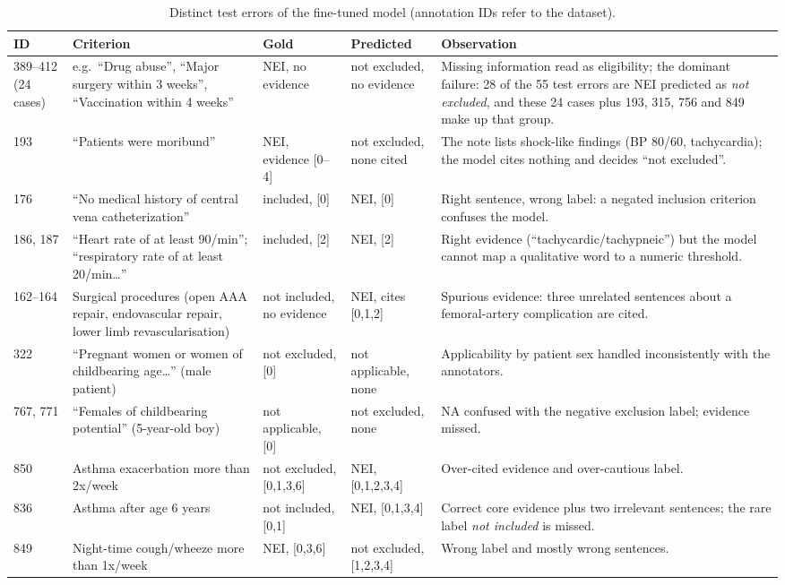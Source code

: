 \documentclass[conference]{IEEEtran}
\begin{document}
\begin{table}[t]
\centering\footnotesize
\caption{Distinct test errors of the fine-tuned model (annotation IDs refer to the dataset).}
\label{tab:errors}
\begin{tabular}{@{}p{0.9cm}p{4.6cm}p{2.3cm}p{2.3cm}p{5.8cm}@{}}\toprule
ID & Criterion & Gold & Predicted & Observation\\\midrule
389--412 (24 cases) & e.g.\ ``Drug abuse'', ``Major surgery within 3 weeks'', ``Vaccination within 4 weeks'' & NEI, no evidence & not excluded, no evidence & Missing information read as eligibility; the dominant failure: 28 of the 55 test errors are NEI predicted as \emph{not excluded}, and these 24 cases plus 193, 315, 756 and 849 make up that group.\\
193 & ``Patients were moribund'' & NEI, evidence [0--4] & not excluded, none cited & The note lists shock-like findings (BP 80/60, tachycardia); the model cites nothing and decides ``not excluded''.\\
176 & ``No medical history of central vena catheterization'' & included, [0] & NEI, [0] & Right sentence, wrong label: a negated inclusion criterion confuses the model.\\
186, 187 & ``Heart rate of at least 90/min''; ``respiratory rate of at least 20/min\ldots'' & included, [2] & NEI, [2] & Right evidence (``tachycardic/tachypneic'') but the model cannot map a qualitative word to a numeric threshold.\\
162--164 & Surgical procedures (open AAA repair, endovascular repair, lower limb revascularisation) & not included, no evidence & NEI, cites [0,1,2] & Spurious evidence: three unrelated sentences about a femoral-artery complication are cited.\\
322 & ``Pregnant women or women of childbearing age\ldots'' (male patient) & not excluded, [0] & not applicable, none & Applicability by patient sex handled inconsistently with the annotators.\\
767, 771 & ``Females of childbearing potential'' (5-year-old boy) & not applicable, [0] & not excluded, none & NA confused with the negative exclusion label; evidence missed.\\
850 & Asthma exacerbation more than 2x/week & not excluded, [0,1,3,6] & NEI, [0,1,2,3,4] & Over-cited evidence and over-cautious label.\\
836 & Asthma after age 6 years & not included, [0,1] & NEI, [0,1,3,4] & Correct core evidence plus two irrelevant sentences; the rare label \emph{not included} is missed.\\
849 & Night-time cough/wheeze more than 1x/week & NEI, [0,3,6] & not excluded, [1,2,3,4] & Wrong label and mostly wrong sentences.\\\bottomrule
\end{tabular}
\end{table}
\end{document}
